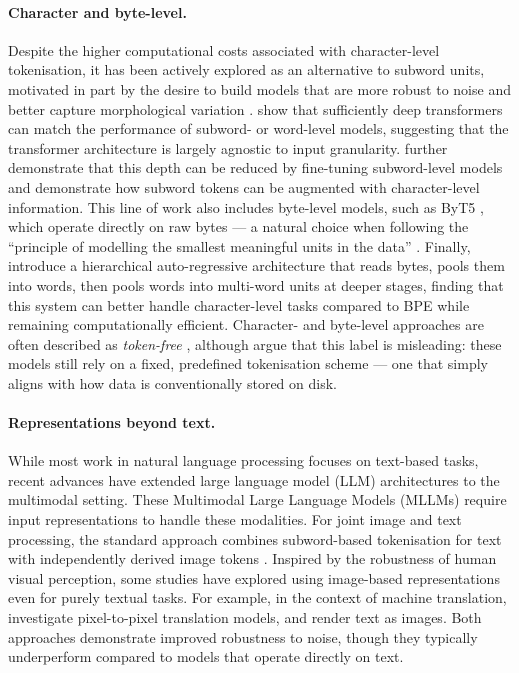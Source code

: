 \paragraph{Character and byte-level.}
Despite the higher computational costs associated with character-level tokenisation, it has been actively explored as an alternative to subword units, motivated in part by the desire to build models that are more robust to noise and better capture morphological variation \citep{gupta2019character}. \citet{al-rfou_character-level_2019} show that sufficiently deep transformers can match the performance of subword- or word-level models, suggesting that the transformer architecture is largely agnostic to input granularity. \citet{libovicky-fraser-2020-towards} further demonstrate that this depth can be reduced by fine-tuning subword-level models and \citet{pinter2021learning} demonstrate how subword tokens can be augmented with character-level information. This line of work also includes byte-level models, such as ByT5 \citep{xue-2022-byt5}, which operate directly on raw bytes --- a natural choice when following the ``principle of modelling the smallest meaningful units in the data'' \citep{graves2013generating}. Finally, \citet{videau2025bytesideaslanguagemodeling} introduce a hierarchical auto-regressive architecture that reads bytes, pools them into words, then pools words into multi-word units at deeper stages, finding that this system can better handle character-level tasks compared to BPE while remaining computationally efficient. 
Character- and byte-level approaches are often described as \emph{token-free} \citep{clark-etal-2022-canine, xue-2022-byt5}, although \citet{mielke2021between} argue that this label is misleading: these models still rely on a fixed, predefined tokenisation scheme --- one that simply aligns with how data is conventionally stored on disk.


\paragraph{Representations beyond text.}

While most work in natural language processing focuses on text-based tasks, recent advances have extended large language model (LLM) architectures to the multimodal setting. These Multimodal Large Language Models (MLLMs) require input representations to handle these modalities. For joint image and text processing, the standard approach combines subword-based tokenisation for text with independently derived image tokens \citep{cui2024survey, team2024chameleon, liu2023visual}. Inspired by the robustness of human visual perception, some studies have explored using image-based representations even for purely textual tasks. For example, in the context of machine translation, \citet{mansimov-etal-2020-towards} investigate pixel-to-pixel translation models, and \citet{salesky-etal-2021-robust} render text as images. Both approaches demonstrate improved robustness to noise, though they typically underperform compared to models that operate directly on text.

